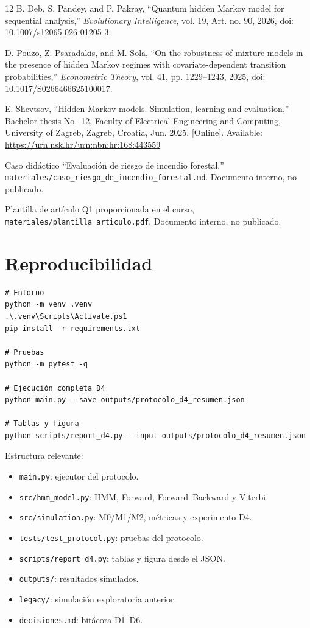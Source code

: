 \documentclass[11pt,a4paper]{article}
\begin{document}
\begin{thebibliography}{12}
B. Deb, S. Pandey, and P. Pakray, ``Quantum hidden Markov model for sequential analysis,'' \emph{Evolutionary Intelligence}, vol. 19, Art. no. 90, 2026, doi: 10.1007/s12065-026-01205-3.

D. Pouzo, Z. Psaradakis, and M. Sola, ``On the robustness of mixture models in the presence of hidden Markov regimes with covariate-dependent transition probabilities,'' \emph{Econometric Theory}, vol. 41, pp. 1229--1243, 2025, doi: 10.1017/S0266466625100017.

E. Shevtsov, ``Hidden Markov models. Simulation, learning and evaluation,'' Bachelor thesis No.~12, Faculty of Electrical Engineering and Computing, University of Zagreb, Zagreb, Croatia, Jun. 2025. [Online]. Available: \url{https://urn.nsk.hr/urn:nbn:hr:168:443559}

Caso didáctico ``Evaluación de riesgo de incendio forestal,'' \texttt{materiales/caso\_riesgo\_de\_incendio\_forestal.md}. Documento interno, no publicado.

Plantilla de artículo Q1 proporcionada en el curso, \texttt{materiales/plantilla\_articulo.pdf}. Documento interno, no publicado.

\end{thebibliography}

\appendix

\section{Reproducibilidad}

\begin{verbatim}
# Entorno
python -m venv .venv
.\.venv\Scripts\Activate.ps1
pip install -r requirements.txt

# Pruebas
python -m pytest -q

# Ejecución completa D4
python main.py --save outputs/protocolo_d4_resumen.json

# Tablas y figura
python scripts/report_d4.py --input outputs/protocolo_d4_resumen.json
\end{verbatim}

Estructura relevante:
\begin{itemize}
  \item \texttt{main.py}: ejecutor del protocolo.
  \item \texttt{src/hmm\_model.py}: HMM, Forward, Forward--Backward y Viterbi.
  \item \texttt{src/simulation.py}: M0/M1/M2, métricas y experimento D4.
  \item \texttt{tests/test\_protocol.py}: pruebas del protocolo.
  \item \texttt{scripts/report\_d4.py}: tablas y figura desde el JSON.
  \item \texttt{outputs/}: resultados simulados.
  \item \texttt{legacy/}: simulación exploratoria anterior.
  \item \texttt{decisiones.md}: bitácora D1--D6.
\end{itemize}
\end{document}
